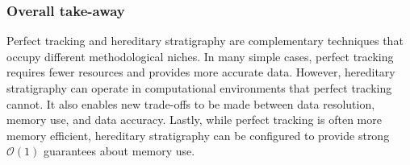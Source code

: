 
\subsubsection{Overall take-away}

Perfect tracking and hereditary stratigraphy are complementary techniques that occupy different methodological niches.
In many simple cases, perfect tracking requires fewer resources and provides more accurate data.
However, hereditary stratigraphy can operate in computational environments that perfect tracking cannot.
It also enables new trade-offs to be made between data resolution, memory use, and data accuracy.
Lastly, while perfect tracking is often more memory efficient, hereditary stratigraphy can be configured to provide strong $\mathcal{O}(1)$ guarantees about memory use.

